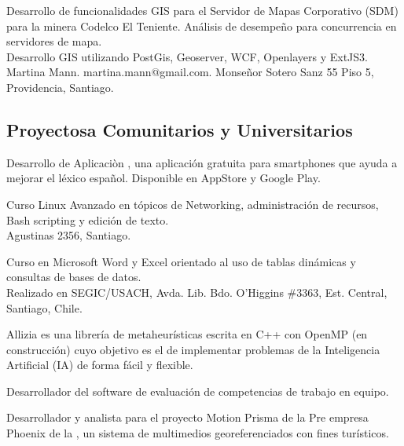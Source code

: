 \documentclass[11pt,letterpaper,roman]{moderncv}
\begin{document}
  {\intership} {\ikom} {\stgo} {}
{Desarrollo de funcionalidades GIS para el Servidor de Mapas Corporativo (SDM)
para la minera Codelco El Teniente. Análisis de desempeño para concurrencia en
servidores de mapa. \\ Desarrollo GIS utilizando PostGis, Geoserver, WCF,
Openlayers y ExtJS3. \\ Martina Mann. martina.mann@gmail.com. Monseñor Sotero Sanz 55 Piso 5, Providencia, Santiago.}

	
\subsection{Proyectosa Comunitarios y Universitarios}

 {\sd} {\ingennia} {\stgo} {}
{Desarrollo de Aplicaciòn \vocablia, una aplicación gratuita para smartphones que ayuda a mejorar el léxico español. Disponible en AppStore y Google Play.}


 {\tchr} {\ipgamma} {\stgo} {}
{Curso \sence Linux Avanzado en tópicos de Networking, administración de
recursos, Bash scripting y edición de texto. \\ Agustinas 2356, Santiago.}

 {\tchr} {\otecnewline} {\stgo} {}
{Curso \sence en Microsoft Word y Excel orientado al uso de tablas dinámicas y
consultas de bases de datos. \\ Realizado en SEGIC/USACH, Avda. Lib. Bdo. O'Higgins \#3363, Est. Central, Santiago, Chile.}

{Allizia es una librería de metaheurísticas escrita en C++ con OpenMP (en
construcción) cuyo objetivo es el de implementar problemas de la Inteligencia
Artificial (IA) de forma fácil y flexible. }

 { } {} {}
{Desarrollador del software de evaluación de competencias de trabajo en equipo.}



 {\sd} { } {} {}
{Desarrollador y analista para el proyecto Motion Prisma de la Pre empresa
Phoenix de la , un sistema de multimedios georeferenciados con fines
turísticos.}
\end{document}
